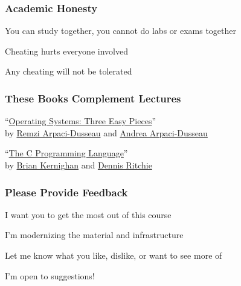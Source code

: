   \begin{frame}
    \frametitle{Academic Honesty}

    You can study together, you cannot do labs or exams together

    \vspace{2em}

    Cheating hurts everyone involved

    \vspace{2em}

    Any cheating will not be tolerated
  \end{frame}

  \begin{frame}
    \frametitle{These Books Complement Lectures}

    ``\href{https://pages.cs.wisc.edu/~remzi/OSTEP/}
           {Operating Systems: Three Easy Pieces}'' \\
    by \href{http://www.cs.wisc.edu/~remzi/}{Remzi Arpaci-Dusseau}
    and \href{http://www.cs.wisc.edu/~dusseau/}{Andrea Arpaci-Dusseau}

    \vspace{2em}

    ``\href{https://en.wikipedia.org/wiki/The_C_Programming_Language}
           {The C Programming Language}'' \\
    by \href{https://en.wikipedia.org/wiki/Brian_Kernighan}{Brian Kernighan}
    and \href{https://en.wikipedia.org/wiki/Dennis_Ritchie}{Dennis Ritchie}
  \end{frame}

  \begin{frame}
    \frametitle{Please Provide Feedback}

    I want you to get the most out of this course

    \vspace{2em}

    I'm modernizing the material and infrastructure

    \vspace{2em}

    Let me know what you like, dislike, or want to see more of

    \vspace{2em}

    I'm open to suggestions!
  \end{frame}



